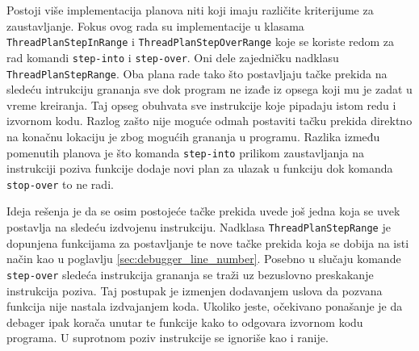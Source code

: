 \documentclass[12pt,oneside]{memoir}
\begin{document}
Postoji više implementacija planova niti koji imaju različite kriterijume za zaustavljanje.
Fokus ovog rada su implementacije u klasama \verb|ThreadPlanStepInRange| i \verb|ThreadPlanStepOverRange| koje se koriste redom za rad komandi \verb|step-into| i \verb|step-over|.
Oni dele zajedničku nadklasu \verb|ThreadPlanStepRange|.
Oba plana rade tako što postavljaju tačke prekida na sledeću intrukciju grananja sve dok program ne izađe iz opsega koji mu je zadat u vreme kreiranja.
Taj opseg obuhvata sve instrukcije koje pipadaju istom redu i izvornom kodu.
Razlog zašto nije moguće odmah postaviti tačku prekida direktno na konačnu lokaciju je zbog mogućih grananja u programu.
Razlika između pomenutih planova je što komanda \verb|step-into| prilikom zaustavljanja na instrukciji poziva funkcije dodaje novi plan za ulazak u funkciju dok komanda \verb|stop-over| to ne radi.

Ideja rešenja je da se osim postojeće tačke prekida uvede još jedna koja se uvek postavlja na sledeću izdvojenu instrukciju.
Nadklasa \verb|ThreadPlanStepRange| je dopunjena funkcijama za postavljanje te nove tačke prekida koja se dobija na isti način kao u poglavlju \ref{sec:debugger_line_number}.
Posebno u slučaju komande \verb|step-over| sledeća instrukcija grananja se traži uz bezuslovno preskakanje instrukcija poziva.
Taj postupak je izmenjen dodavanjem uslova da pozvana funkcija nije nastala izdvajanjem koda.
Ukoliko jeste, očekivano ponašanje je da debager ipak korača unutar te funkcije kako to odgovara izvornom kodu programa.
U suprotnom poziv instrukcije se ignoriše kao i ranije.
\end{document}
